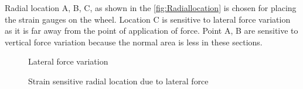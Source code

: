 \documentclass[]{interact}
\theoremstyle{plain}%
\theoremstyle{definition}
\theoremstyle{remark}
\begin{document}
Radial location A, B, C, as shown in the \cref{fig:Radiallocation}  is chosen for placing the strain gauges on the wheel. Location C is sensitive to lateral force variation as it is far away from the point of application of force. Point A, B are sensitive to vertical force variation because the normal area is less in these sections.

\begin{figure}[h]
\centering
{}
\caption{ Lateral force variation} \label{fig:horizontalforcevariation}
\end{figure}


\begin{figure}[h]
\centering
{}
\caption{Strain sensitive radial location due to lateral force} \label{fig:strainvertical}
\end{figure}
\end{document}
